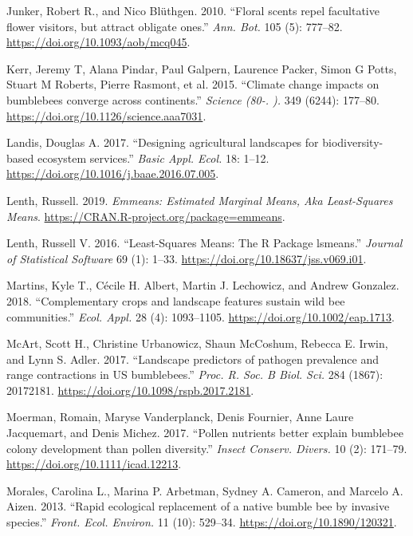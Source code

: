 \documentclass[11pt,]{article}
\begin{document}
\leavevmode\hypertarget{ref-Junker2010}{}%
Junker, Robert R., and Nico Blüthgen. 2010. ``Floral scents repel
facultative flower visitors, but attract obligate ones.'' \emph{Ann.
Bot.} 105 (5): 777--82. \url{https://doi.org/10.1093/aob/mcq045}.

\leavevmode\hypertarget{ref-Kerr2015}{}%
Kerr, Jeremy T, Alana Pindar, Paul Galpern, Laurence Packer, Simon G
Potts, Stuart M Roberts, Pierre Rasmont, et al. 2015. ``Climate change
impacts on bumblebees converge across continents.'' \emph{Science (80-.
).} 349 (6244): 177--80. \url{https://doi.org/10.1126/science.aaa7031}.

\leavevmode\hypertarget{ref-Landis2017}{}%
Landis, Douglas A. 2017. ``Designing agricultural landscapes for
biodiversity-based ecosystem services.'' \emph{Basic Appl. Ecol.} 18:
1--12. \url{https://doi.org/10.1016/j.baae.2016.07.005}.

\leavevmode\hypertarget{ref-emmeans}{}%
Lenth, Russell. 2019. \emph{Emmeans: Estimated Marginal Means, Aka
Least-Squares Means}. \url{https://CRAN.R-project.org/package=emmeans}.

\leavevmode\hypertarget{ref-lsmeans}{}%
Lenth, Russell V. 2016. ``Least-Squares Means: The R Package lsmeans.''
\emph{Journal of Statistical Software} 69 (1): 1--33.
\url{https://doi.org/10.18637/jss.v069.i01}.

\leavevmode\hypertarget{ref-Martins2018}{}%
Martins, Kyle T., Cécile H. Albert, Martin J. Lechowicz, and Andrew
Gonzalez. 2018. ``Complementary crops and landscape features sustain
wild bee communities.'' \emph{Ecol. Appl.} 28 (4): 1093--1105.
\url{https://doi.org/10.1002/eap.1713}.

\leavevmode\hypertarget{ref-McArt2017}{}%
McArt, Scott H., Christine Urbanowicz, Shaun McCoshum, Rebecca E. Irwin,
and Lynn S. Adler. 2017. ``Landscape predictors of pathogen prevalence
and range contractions in US bumblebees.'' \emph{Proc. R. Soc. B Biol.
Sci.} 284 (1867): 20172181.
\url{https://doi.org/10.1098/rspb.2017.2181}.

\leavevmode\hypertarget{ref-Moerman2017}{}%
Moerman, Romain, Maryse Vanderplanck, Denis Fournier, Anne Laure
Jacquemart, and Denis Michez. 2017. ``Pollen nutrients better explain
bumblebee colony development than pollen diversity.'' \emph{Insect
Conserv. Divers.} 10 (2): 171--79.
\url{https://doi.org/10.1111/icad.12213}.

\leavevmode\hypertarget{ref-Morales2013}{}%
Morales, Carolina L., Marina P. Arbetman, Sydney A. Cameron, and Marcelo
A. Aizen. 2013. ``Rapid ecological replacement of a native bumble bee by
invasive species.'' \emph{Front. Ecol. Environ.} 11 (10): 529--34.
\url{https://doi.org/10.1890/120321}.
\end{document}
